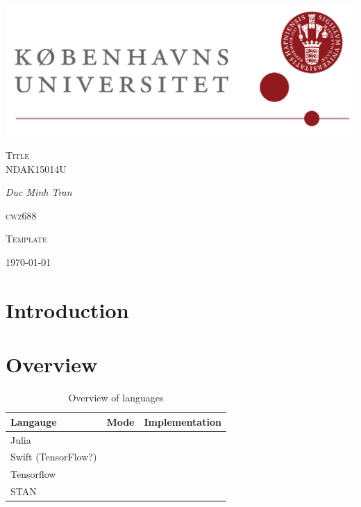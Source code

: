 
\author{Minh}

	\begin{titlepage}
		\centering
		\includegraphics[width=\textwidth]{KuLogo.png}
		\par\vspace{1cm}
		\vspace{1cm}
		{\scshape\Large Title \\
			NDAK15014U\par}
		\vspace{1.5cm}
		{\Large\itshape Duc Minh Tran }\\
		\vspace{0.5cm}
		{\scshape\large cwz688 \\ \par}
		\vfill
		{\Large\scshape Template \par}
		\vfill
		\par
		\vfill
		{\large \today\par}
	\end{titlepage}
	\newpage
	\section{Introduction}


  \section{Overview}
  \begin{table}[H]
    \centering
    \begin{tabular}{l|ll}
      \textbf{Langauge} & Mode & Implementation  \\ \hline
      Julia                &     & \\
      Swift (TensorFlow?)  &     & \\
      Tensorflow           &     & \\
      STAN                 &     & \\
    \end{tabular}
    \caption{Overview of languages}
    \label{tab:overview}
  \end{table}


  \nocite{small}
  \printbibliography



